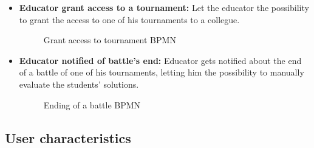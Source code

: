 \documentclass{article}
\begin{document}
{\begin{itemize}
            \item \textbf{Educator grant access to a tournament:} Let the educator the possibility to grant the access to one of his tournaments to a collegue.
            \begin{figure}[H]
                \centering
                \caption{Grant access to tournament BPMN}
                \label{fig:enter-label}
            \end{figure}

            \item \textbf{Educator notified of battle's end:} Educator gets notified about the end of a battle of one of his tournaments, letting him the possibility to manually evaluate the students' solutions.
            \begin{figure}[H]
                \centering
                \caption{Ending of a battle BPMN}
                \label{fig:enter-label}
            \end{figure}
        \end{itemize}
\subsection{User characteristics}
}
\end{document}
